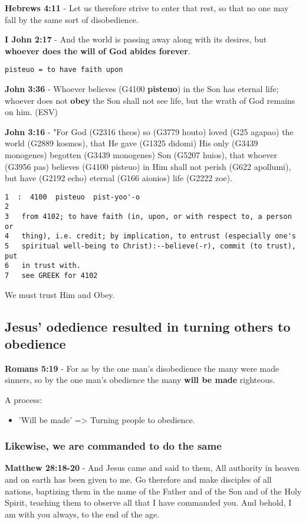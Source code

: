 \documentclass[11pt]{article}
\begin{document}
\textbf{Hebrews 4:11} - Let us therefore strive to enter that rest, so that no one may fall by the same sort of disobedience.

\textbf{I John 2:17} - And the world is passing away along with its desires, but \textbf{whoever does the will of God abides forever}.

\texttt{pisteuo = to have faith upon}

\textbf{John 3:36} - Whoever believes (G4100 \textbf{pisteuo}) in the Son has eternal life; whoever does not \textbf{obey} the Son shall not see life, but the wrath of God remains on him. (ESV)

\textbf{John 3:16} - "For God (G2316 theos) so (G3779 houto) loved (G25 agapao) the world (G2889 kosmos), that He gave (G1325 didomi) His only (G3439 monogenes) begotten (G3439 monogenes) Son (G5207 huios), that whoever (G3956 pas) believes (G4100 pisteuo) in Him shall not perish (G622 apollumi), but have (G2192 echo) eternal (G166 aionios) life (G2222 zoe).

\begin{verbatim}
1  :  4100  pisteuo  pist-yoo'-o
2  
3   from 4102; to have faith (in, upon, or with respect to, a person or
4   thing), i.e. credit; by implication, to entrust (especially one's
5   spiritual well-being to Christ):--believe(-r), commit (to trust), put
6   in trust with.
7   see GREEK for 4102
\end{verbatim}

We must trust Him and Obey.

\subsection{Jesus' odedience resulted in turning others to obedience}
\label{sec:org55d422f}
\textbf{Romans 5:19} - For as by the one man's disobedience the many were made sinners, so by the one man's obedience the many \textbf{will be made} righteous.

A process:
\begin{itemize}
\item 'Will be made' => Turning people to obedience.
\end{itemize}

\subsubsection{Likewise, we are commanded to do the same}
\label{sec:orgb221134}
\textbf{Matthew 28:18-20} - And Jesus came and said to them, All authority in heaven and on earth has been given to me. Go therefore and make disciples of all nations, baptizing them in the name of the Father and of the Son and of the Holy Spirit, teaching them to observe all that I have commanded you. And behold, I am with you always, to the end of the age.
\end{document}
